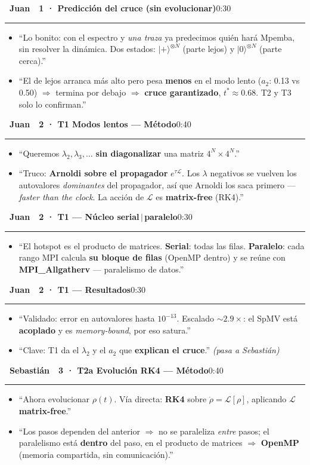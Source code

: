 \documentclass[11pt,a4paper]{article}
\newcommand{\Jb}{\colorbox{juan}{\color{white}\bfseries\footnotesize~Juan~}}
\newcommand{\Sb}{\colorbox{seb}{\color{white}\bfseries\footnotesize~Sebastián~}}
\newcommand{\cs}[1]{\textcolor{seb}{\textbf{#1}}}
\newcommand{\blk}[3]{%
  \par\medskip\noindent #1\ \textbf{#2}\hfill\textcolor{soft}{\small #3}\par
  \vspace{-4pt}\textcolor{soft!40}{\rule{\linewidth}{0.4pt}}\par\vspace{-2pt}}
\begin{document}
\blk{\Jb}{1 · Predicción del cruce (sin evolucionar)}{0:30}
\begin{itemize}
  \item ``Lo bonito: con el espectro y \emph{una traza} ya predecimos quién hará
    Mpemba, sin resolver la dinámica. Dos estados: $|+\rangle^{\otimes N}$ (parte lejos)
    y $|0\rangle^{\otimes N}$ (parte cerca).''
  \item ``El de lejos arranca más alto pero pesa \textbf{menos} en el modo lento
    ($a_2$: 0.13 vs 0.50) $\Rightarrow$ termina por debajo $\Rightarrow$ \textbf{cruce
    garantizado}, $t^*\approx0.68$. T2 y T3 solo lo confirman.''
\end{itemize}

\blk{\Jb}{2 · T1 Modos lentos --- Método}{0:40}
\begin{itemize}
  \item ``Queremos $\lambda_2,\lambda_3,\dots$ \textbf{sin diagonalizar} una matriz $4^N\times4^N$.''
  \item ``Truco: \textbf{Arnoldi sobre el propagador} $e^{\tau\mathcal{L}}$. Los $\lambda$
    negativos se vuelven los autovalores \emph{dominantes} del propagador, así que
    Arnoldi los saca primero --- \emph{faster than the clock}. La acción de
    $\mathcal{L}$ es \textbf{matrix-free} (RK4).''
\end{itemize}

\blk{\Jb}{2 · T1 --- Núcleo serial\,$\vert$\,paralelo}{0:30}
\begin{itemize}
  \item ``El hotspot es el producto de matrices. \textbf{Serial}: todas las filas.
    \textbf{Paralelo}: cada rango MPI calcula \textbf{su bloque de filas} (OpenMP
    dentro) y se reúne con \cs{MPI\_Allgatherv} --- paralelismo de datos.''
\end{itemize}

\blk{\Jb}{2 · T1 --- Resultados}{0:30}
\begin{itemize}
  \item ``Validado: error en autovalores hasta $10^{-13}$. Escalado $\sim2.9\times$:
    el SpMV está \textbf{acoplado} y es \emph{memory-bound}, por eso satura.''
  \item ``Clave: T1 da el $\lambda_2$ y el $a_2$ que \textbf{explican el cruce}.''
    \emph{(pasa a Sebastián)}
\end{itemize}

\blk{\Sb}{3 · T2a Evolución RK4 --- Método}{0:40}
\begin{itemize}
  \item ``Ahora evolucionar $\rho(t)$. Vía directa: \textbf{RK4} sobre
    $\dot\rho=\mathcal{L}[\rho]$, aplicando $\mathcal{L}$ \textbf{matrix-free}.''
  \item ``Los pasos dependen del anterior $\Rightarrow$ no se paraleliza \emph{entre}
    pasos; el paralelismo está \textbf{dentro} del paso, en el producto de matrices
    $\Rightarrow$ \textbf{OpenMP} (memoria compartida, sin comunicación).''
\end{itemize}
\end{document}
